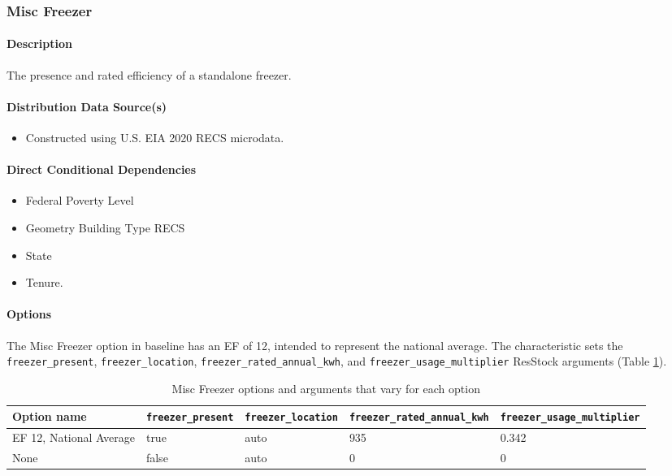 \subsubsection{Misc Freezer}
\paragraph{Description}
The presence and rated efficiency of a standalone freezer.
\paragraph{Distribution Data Source(s)}
\begin{itemize}
\item 

Constructed using U.S. EIA 2020 RECS microdata.
\end{itemize}


\paragraph{Direct Conditional Dependencies}
\begin{itemize}
    \item Federal Poverty Level
    \item Geometry Building Type RECS
    \item State
    \item Tenure.
\end{itemize}

\paragraph{Options}
The Misc Freezer option in baseline has an EF of 12, intended to represent the national average. The characteristic sets the \texttt{freezer\_present}, \texttt{freezer\_location}, \texttt{freezer\_rated\_annual\_kwh}, and \texttt{freezer\_usage\_multiplier} ResStock arguments (Table \ref{table:hc_opt_freezer}).

\begin{longtable}[]{ |p{3cm}|p{3cm}|p{3cm}|p{3cm}|p{3cm}| }
\caption{Misc Freezer options and arguments that vary for each option} \label{table:hc_opt_freezer} \\
\toprule\noalign{}
Option name & \texttt{freezer\_present} &
\texttt{freezer\_location} & \texttt{freezer\_rated\_annual\_kwh} &
\texttt{freezer\_usage\_multiplier} \\
\midrule\noalign{}
\endhead
\bottomrule\noalign{}
\endlastfoot
EF 12, National Average & true & auto & 935 & 0.342 \\
None & false & auto & 0 & 0 \\
\end{longtable}

